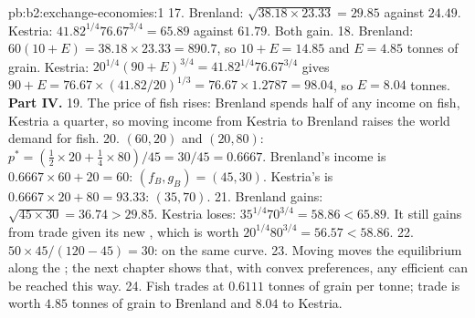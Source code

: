 \begin{solution}{pb:b2:exchange-economies:1}
17. Brenland: $\sqrt{38.18 \times 23.33} = 29.85$ against $24.49$. Kestria: $41.82^{1/4}76.67^{3/4} =
65.89$ against $61.79$. Both gain.
18. Brenland: $60(10 + E) = 38.18 \times 23.33 = 890.7$, so $10 + E = 14.85$ and $E = 4.85$ tonnes of
grain. Kestria: $20^{1/4}(90 + E)^{3/4} = 41.82^{1/4}76.67^{3/4}$ gives $90 + E = 76.67 \times
(41.82/20)^{1/3} = 76.67 \times 1.2787 = 98.04$, so $E = 8.04$ tonnes.
\textbf{Part IV.}
19. The price of fish rises: Brenland spends half of any income on fish, Kestria a quarter, so moving
income from Kestria to Brenland raises the world demand for fish.
20.  $(60, 20)$ and $(20, 80)$: $p^* = (\tfrac12 \times 20 + \tfrac14 \times 80)/45 = 30/45 =
0.6667$. Brenland's income is $0.6667 \times 60 + 20 = 60$: $(f_B, g_B) = (45, 30)$. Kestria's is
$0.6667 \times 20 + 80 = 93.33$: $(35, 70)$.
21. Brenland gains: $\sqrt{45 \times 30} = 36.74 > 29.85$. Kestria loses: $35^{1/4}70^{3/4} = 58.86 <
65.89$. It still gains from trade given its new , which is worth $20^{1/4}80^{3/4} = 56.57 <
58.86$.
22. $50 \times 45/(120 - 45) = 30$: on the same curve.
23. Moving  moves the equilibrium along the ; the next chapter shows that, with
convex preferences, any efficient  can be reached this way.
24. Fish trades at $0.6111$ tonnes of grain per tonne; trade is worth $4.85$ tonnes of grain to Brenland
and $8.04$ to Kestria.
\end{solution}
